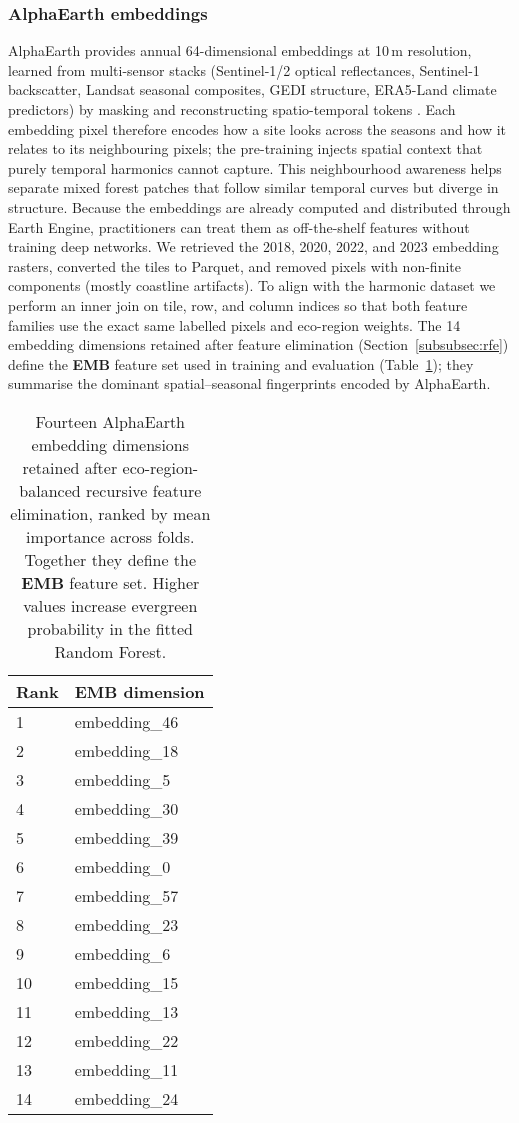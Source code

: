 \documentclass[utf8]{FrontiersinHarvard}
\begin{document}
\subsubsection{AlphaEarth embeddings}
AlphaEarth provides annual 64-dimensional embeddings at 10\,m resolution, learned from multi-sensor stacks (Sentinel-1/2 optical reflectances, Sentinel-1 backscatter, Landsat seasonal composites, GEDI structure, ERA5-Land climate predictors) by masking and reconstructing spatio-temporal tokens \citep{AlphaEarth2025}. Each embedding pixel therefore encodes how a site looks across the seasons and how it relates to its neighbouring pixels; the pre-training injects spatial context that purely temporal harmonics cannot capture. This neighbourhood awareness helps separate mixed forest patches that follow similar temporal curves but diverge in structure. Because the embeddings are already computed and distributed through Earth Engine, practitioners can treat them as off-the-shelf features without training deep networks. We retrieved the 2018, 2020, 2022, and 2023 embedding rasters, converted the tiles to Parquet, and removed pixels with non-finite components (mostly coastline artifacts). To align with the harmonic dataset we perform an inner join on tile, row, and column indices so that both feature families use the exact same labelled pixels and eco-region weights. The 14 embedding dimensions retained after feature elimination (Section~\ref{subsubsec:rfe}) define the \textbf{EMB} feature set used in training and evaluation (Table~\ref{tab:emb14}); they summarise the dominant spatial–seasonal fingerprints encoded by AlphaEarth.

\begin{table}[H]
    \centering
    \small
    \begin{tabular}{ll}
        \hline
        \textbf{Rank} & \textbf{EMB dimension} \\
        \hline
        1 & embedding\_46 \\
        2 & embedding\_18 \\
        3 & embedding\_5 \\
        4 & embedding\_30 \\
        5 & embedding\_39 \\
        6 & embedding\_0 \\
        7 & embedding\_57 \\
        8 & embedding\_23 \\
        9 & embedding\_6 \\
        10 & embedding\_15 \\
        11 & embedding\_13 \\
        12 & embedding\_22 \\
        13 & embedding\_11 \\
        14 & embedding\_24 \\
        \hline
    \end{tabular}
    \caption{Fourteen AlphaEarth embedding dimensions retained after eco-region-balanced recursive feature elimination, ranked by mean importance across folds. Together they define the \textbf{EMB} feature set. Higher values increase evergreen probability in the fitted Random Forest.}
    \label{tab:emb14}
\end{table}
\end{document}

